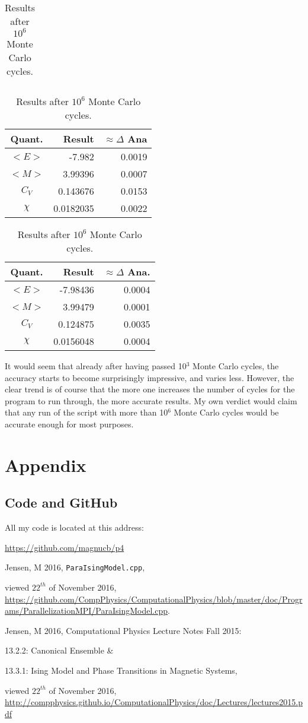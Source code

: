 \documentclass[11pt,a4paper,notitlepage,twocolumn]{article}
\begin{document}
\begin{table}[H]
\begin{tabular}{|c|r|r|}
\end{tabular}
\caption{Results after $10^4$ Monte Carlo cycles.}\label{table:4bresults10000}
\begin{tabular}{|c|r|r|}\hline
	Quant.& Result & $\approx\Delta$ Ana\\ \hline
	$<E>$ &-7.982  & 0.0019 \\ \hline
	$<M>$ & 3.99396    & 0.0007 \\ \hline
	$C_V$ & 0.143676   & 0.0153 \\ \hline
	$\chi$& 0.0182035   & 0.0022 \\ \hline
\end{tabular}
\caption{Results after $10^5$ Monte Carlo cycles.}\label{table:4bresults100000}
\begin{tabular}{|c|r|r|}\hline
	Quant.& Result & $\approx\Delta$ Ana.\\ \hline
	$<E>$ &-7.98436 & 0.0004 \\ \hline
	$<M>$ & 3.99479 & 0.0001 \\ \hline
	$C_V$ & 0.124875 & 0.0035 \\ \hline
	$\chi$& 0.0156048 & 0.0004 \\ \hline
\end{tabular}
\caption{Results after $10^6$ Monte Carlo cycles.}\label{table:4bresults1000000}
\end{table}

It would seem that already after having passed 10$^3$ Monte Carlo cycles, the accuracy starts to become surprisingly impressive, and varies less. However, the clear trend is of course that the more one increases the number of cycles for the program to run through, the more accurate results. My own verdict would claim that any run of the script with more than 10$^6$ Monte Carlo cycles would be accurate enough for most purposes.

\section{Appendix}
\subsection{Code and GitHub}
All my code is located at this address:

\url{https://github.com/magnucb/p4}

\begin{thebibliography}{9}
  Jensen, M 2016,
  \verb|ParaIsingModel.cpp|,
  
  viewed $22^{th}$ of November 2016,
  \url{https://github.com/CompPhysics/ComputationalPhysics/blob/master/doc/Programs/ParallelizationMPI/ParaIsingModel.cpp}.
  
	Jensen, M 2016, 
	Computational Physics Lecture Notes Fall 2015:
	
	13.2.2: Canonical Ensemble \& 
	
	13.3.1: Ising Model and Phase Transitions in Magnetic Systems,
	
	viewed $22^{th}$ of November 2016, 
	\url{http://compphysics.github.io/ComputationalPhysics/doc/Lectures/lectures2015.pdf}

\end{thebibliography}
\end{document}
